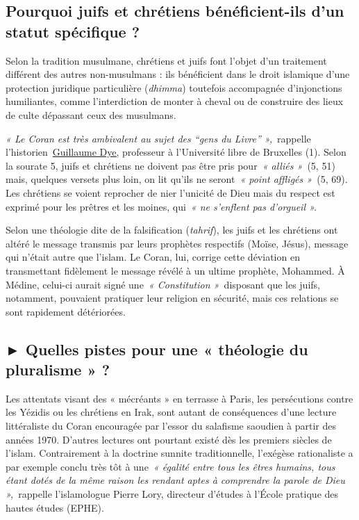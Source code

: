 \subsection{ Pourquoi juifs et chrétiens bénéficient-ils d'un statut
spécifique ?}

Selon la tradition musulmane, chrétiens et juifs font l'objet d'un
traitement différent des autres non-musulmans : ils bénéficient dans le
droit islamique d'une protection juridique particulière (\emph{dhimma})
toutefois accompagnée d'injonctions humiliantes, comme l'interdiction de
monter à cheval ou de construire des lieux de culte dépassant ceux des
musulmans.
 

\emph{« Le Coran est très ambivalent au sujet des ``gens du Livre''
»,~}rappelle
l'historien~\href{https://www.la-croix.com/Culture/Livres-et-idees/historiens-decryptent-Coran-avant-lislam-2019-11-27-1201063090}{\underline{Guillaume
Dye}}, professeur à l'Université libre de Bruxelles (1). Selon la
sourate 5, juifs et chrétiens ne doivent pas être pris pour~\emph{«
alliés »~}(5, 51) mais, quelques versets plus loin, on lit qu'ils ne
seront~\emph{« point affligés »~}(5, 69). Les chrétiens se voient
reprocher de nier l'unicité de Dieu mais du respect est exprimé pour les
prêtres et les moines, qui~\emph{« ne s'enflent pas d'orgueil ».}

Selon une théologie dite de la falsification (\emph{tahrif}), les juifs
et les chrétiens ont altéré le message transmis par leurs prophètes
respectifs (Moïse, Jésus), message qui n'était autre que l'islam. Le
Coran, lui, corrige cette déviation en transmettant fidèlement le
message révélé à un ultime prophète, Mohammed. À Médine, celui-ci aurait
signé une~\emph{« Constitution »~}disposant que les juifs, notamment,
pouvaient pratiquer leur religion en sécurité, mais ces relations se
sont rapidement détériorées.

\subsection{► Quelles pistes pour une « théologie du pluralisme » ?}

Les attentats visant des « mécréants » en terrasse à Paris, les
persécutions contre les Yézidis ou les chrétiens en Irak, sont autant de
conséquences d'une lecture littéraliste du Coran encouragée par l'essor
du salafisme saoudien à partir des années 1970. D'autres lectures ont
pourtant existé dès les premiers siècles de l'islam. Contrairement à la
doctrine sunnite traditionnelle, l'exégèse rationaliste a par exemple
conclu très tôt à une~\emph{« égalité entre tous les êtres humains, tous
étant dotés de la même raison les rendant aptes à comprendre la parole
de Dieu »,~}rappelle l'islamologue Pierre Lory, directeur d'études à
l'École pratique des hautes études (EPHE).

